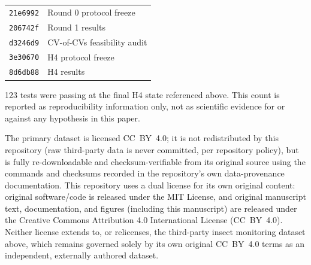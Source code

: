 \documentclass[11pt]{article}
\begin{document}
\begin{center}
\begin{tabular}{@{}ll@{}}
\toprule
\texttt{21e6992} & Round 0 protocol freeze \\
\texttt{206742f} & Round 1 results \\
\texttt{d3246d9} & CV-of-CVs feasibility audit \\
\texttt{3e30670} & H4 protocol freeze \\
\texttt{8d6db88} & H4 results \\
\bottomrule
\end{tabular}
\end{center}

123 tests were passing at the final H4 state referenced above. This count
is reported as reproducibility information only, not as scientific
evidence for or against any hypothesis in this paper.

The primary dataset \citep{vanklink2020} is licensed CC~BY~4.0; it is not
redistributed by this repository (raw third-party data is never
committed, per repository policy), but is fully re-downloadable and
checksum-verifiable from its original source using the commands and
checksums recorded in the repository's own data-provenance
documentation. This repository uses a dual license for its own original
content: original software/code is released under the MIT License, and
original manuscript text, documentation, and figures (including this
manuscript) are released under the Creative Commons Attribution 4.0
International License (CC~BY~4.0). Neither license extends to, or
relicenses, the third-party insect monitoring dataset above, which
remains governed solely by its own original CC~BY~4.0 terms as an
independent, externally authored dataset.
\end{document}
